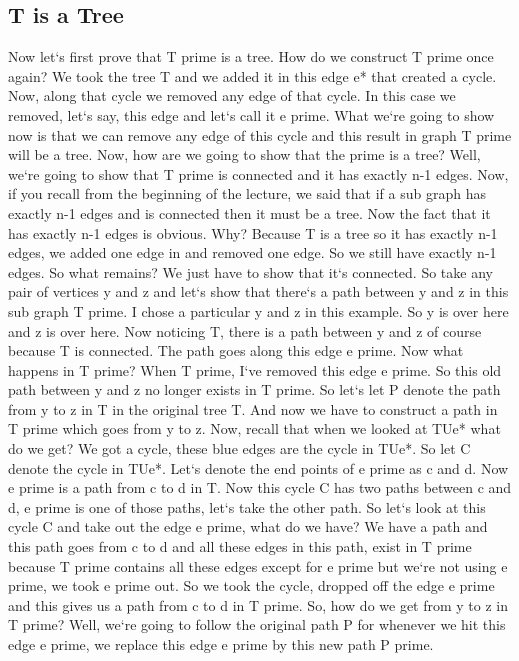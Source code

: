 \subsection{T is a Tree}
Now let`s first prove that T prime is a tree.
How do we construct T prime once again? We took the tree T and we added it in this edge e* that created a cycle.
Now, along that cycle we removed any edge of that cycle.
In this case we removed, let`s say, this edge and let`s call it e prime.
What we`re going to show now is that we can remove any edge of this cycle and this result in graph T prime will be a tree.
Now, how are we going to show that the prime is a tree? Well, we`re going to show that T prime is connected and it has exactly n-1 edges.
Now, if you recall from the beginning of the lecture, we said that if a sub graph has exactly n-1 edges and is connected then it must be a tree.
Now the fact that it has exactly n-1 edges is obvious.
Why? Because T is a tree so it has exactly n-1 edges, we added one edge in and removed one edge.
So we still have exactly n-1 edges.
So what remains? We just have to show that it`s connected.
So take any pair of vertices y and z and let`s show that there`s a path between y and z in this sub graph T prime.
I chose a particular y and z in this example.
So y is over here and z is over here.
Now noticing T, there is a path between y and z of course because T is connected.
The path goes along this edge e prime.
Now what happens in T prime? When T prime, I`ve removed this edge e prime.
So this old path between y and z no longer exists in T prime.
So let`s let P denote the path from y to z in T in the original tree T\@.
And now we have to construct a path in T prime which goes from y to z.
Now, recall that when we looked at TUe* what do we get? We got a cycle, these blue edges are the cycle in TUe*.
So let C denote the cycle in TUe*.
Let`s denote the end points of e prime as c and d.
Now e prime is a path from c to d in T\@.
Now this cycle C has two paths between c and d, e prime is one of those paths, let`s take the other path.
So let`s look at this cycle C and take out the edge e prime, what do we have? We have a path and this path goes from c to d and all these edges in this path, exist in T prime because T prime contains all these edges except for e prime but we`re not using e prime, we took e prime out.
So we took the cycle, dropped off the edge e prime and this gives us a path from c to d in T prime.
So, how do we get from y to z in T prime? Well, we`re going to follow the original path P for whenever we hit this edge e prime, we replace this edge e prime by this new path P prime.

